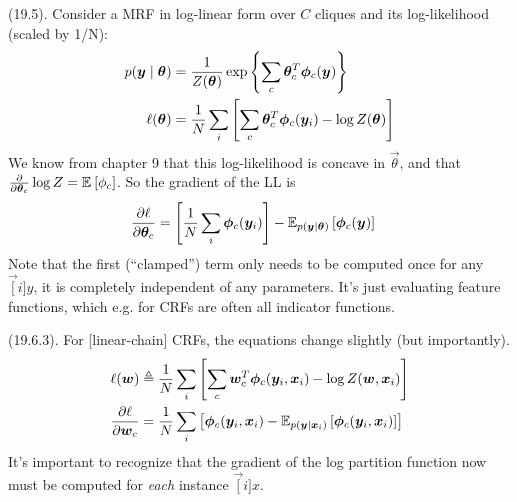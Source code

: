 \documentclass[11pt]{article}
\begin{document}
\p {} (19.5). Consider a MRF in log-linear form over $C$ cliques and its log-likelihood (scaled by 1/N):
\begin{align}
	p(\vec y \mid \vec\theta)	
		&= \inv{Z(\vec\theta)} \exp\left\{ \sum_c \vec[c]{\theta}^T \vec[c]{\phi}(\vec y)  \right\} \\
	\ell(\vec\theta)
		&= \inv{N} \sum_i \left[ \sum_c  \vec[c]{\theta}^T \vec[c]{\phi}(\vec[i]{y}) - \log Z(\vec\theta)    \right]
\end{align}
We know from chapter 9 that this log-likelihood is concave in $\vec\theta$, and that $\pderiv{}{\vec[c]{\theta}} \log Z = \E{\phi_c}$. So the gradient of the LL is
\begin{align}
	\pderiv{\ell}{\vec[c]{\theta}} 
		&= \left[ \inv{N} \sum_i \vec[c]{\phi}(\vec[i]{y}) \right] - \E[p(\vec y \mid \vec\theta)]{\vec[c]{\phi}(\vec y)}
\end{align}
Note that the first (``clamped'') term only needs to be computed once for any $\vec[i]{y}$, it is completely independent of any parameters. It's just evaluating feature functions, which e.g. for CRFs are often all indicator functions.

\myspace
\p {} (19.6.3). For [linear-chain] CRFs, the equations change slightly (but importantly).
\begin{align}
	\ell(\vec w)
		&\triangleq \inv{N} \sum_i \left[ \sum_c \vec[c]{w}^T \vec[c]{\phi}(\vec[i]{y}, \vec[i]{x}) - \log Z(\vec w, \vec[i]{x}) \right] \\
	\pderiv{\ell}{\vec[c]{w}}
		&= \inv{N} \sum_i \left[
			\vec[c]{\phi}(\vec[i]{y}, \vec[i]{x}) 
		- \E[ p( \vec{y} \mid  \bm{x}_i ) ]{ \vec[c]{\phi}(\vec[i]{y}, \vec[i]{x}) }		
		\right]
\end{align}
It's important to recognize that the gradient of the log partition function now must be computed for \textit{each} instance $\vec[i]{x}$. 




\label{Convex Optimization}
\end{document}
